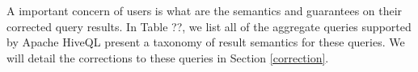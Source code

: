 A important concern of users is what are the semantics and guarantees on their corrected query results.
In Table ??, we list all of the aggregate queries supported by Apache HiveQL present a taxonomy of result semantics for these queries.
We will detail the corrections to these queries in Section \ref{correction}.
\fi